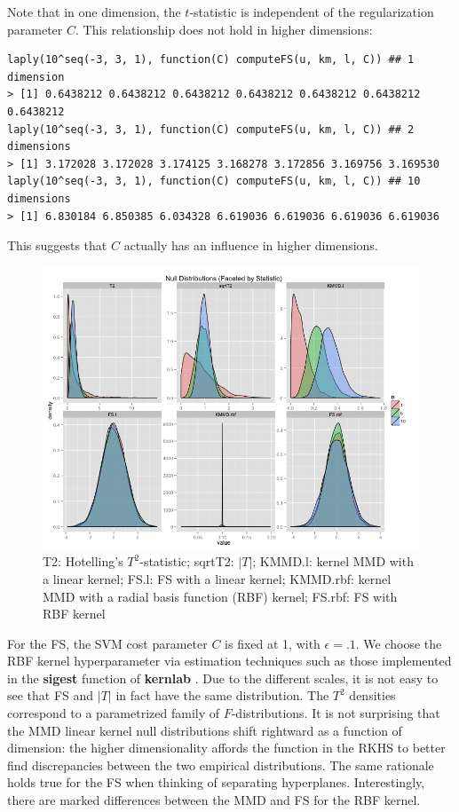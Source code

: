 Note that in one dimension, the $t$-statistic is independent of the
regularization parameter $C$.  This relationship does not hold in
higher dimensions:
\begin{verbatim}
laply(10^seq(-3, 3, 1), function(C) computeFS(u, km, l, C)) ## 1 dimension
> [1] 0.6438212 0.6438212 0.6438212 0.6438212 0.6438212 0.6438212 0.6438212
laply(10^seq(-3, 3, 1), function(C) computeFS(u, km, l, C)) ## 2 dimensions
> [1] 3.172028 3.172028 3.174125 3.168278 3.172856 3.169756 3.169530
laply(10^seq(-3, 3, 1), function(C) computeFS(u, km, l, C)) ## 10 dimensions
> [1] 6.830184 6.850385 6.034328 6.619036 6.619036 6.619036 6.619036
\end{verbatim}
This suggests that $C$ actually has an influence in higher dimensions.

\begin{figure}
\centering
\includegraphics[width=.8\linewidth]{null_dist.png}
\caption{T2: Hotelling's $T^2$-statistic; sqrtT2: $|T|$;
KMMD.l: kernel MMD with a linear kernel; FS.l: FS with a
linear kernel; KMMD.rbf: kernel MMD with a radial basis function (RBF) kernel;
FS.rbf: FS with RBF kernel}
\label{fig:null_dist}
\end{figure}

For the FS, the SVM cost parameter $C$ is fixed at 1, with $\epsilon =
.1$.  We choose the RBF kernel hyperparameter via estimation
techniques such as those implemented in the {\bf sigest} function of 
{\bf kernlab} \cite{kernlab}.  Due to the different
scales, it is not easy to see that FS and
$|T|$ in fact have the same distribution.  The $T^2$ densities correspond to a
parametrized family of $F$-distributions.  It is not surprising that the MMD
linear kernel null distributions shift rightward as a function of
dimension: the higher dimensionality affords the function in the RKHS
to better find discrepancies between the two empirical distributions.
The same rationale holds true for the FS when thinking of separating
hyperplanes.  Interestingly, there are marked differences between the
MMD and FS for the RBF kernel.


